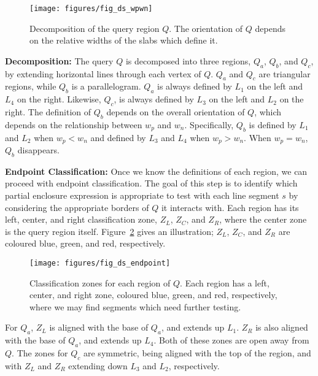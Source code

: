 \begin{figure}[t]
\begin{center}
  \texttt{[image: figures/fig\_ds\_wpwn]}
  \caption[Decomposition of the query region $Q$.]{Decomposition of the query region $Q$. The orientation of $Q$ depends on the relative widths of the slabs which define it.}
  \label{fig:slabs:two:wpwn}
\end{center}
\end{figure}

{\bf Decomposition:}
The query $Q$ is decomposed into three regions, $Q_a$, $Q_b$, and $Q_c$, by extending horizontal lines through each vertex of $Q$.
$Q_a$ and $Q_c$ are triangular regions, while $Q_b$ is a parallelogram. 
$Q_a$ is always defined by $L_1$ on the left and $L_4$ on the right. 
Likewise, $Q_c$, is always defined by $L_3$ on the left and $L_2$ on the right. 
The definition of $Q_b$ depends on the overall orientation of $Q$, which depends on the relationship between $w_p$ and $w_n$.
Specifically, $Q_b$ is defined by $L_1$ and $L_2$ when $w_p < w_n$ and defined by $L_3$ and $L_4$ when $w_p > w_n$.
When $w_p = w_n$, $Q_b$ disappears.


{\bf Endpoint Classification:}
Once we know the definitions of each region, we can proceed with endpoint classification.
The goal of this step is to identify which partial enclosure expression is appropriate to test with each line segment $s$ by considering the appropriate borders of $Q$ it interacts with. 
Each region has its left, center, and right classification zone, $Z_L$, $Z_C$, and $Z_R$, where the center zone is the query region itself.
Figure~\ref{fig:slabs:two:endpoint} gives an illustration; $Z_L$, $Z_C$, and $Z_R$ are coloured blue, green, and red, respectively.

\begin{figure}[t]
\begin{center}
  \texttt{[image: figures/fig\_ds\_endpoint]}
  \caption[Classification zones for $Q$.]{Classification zones for each region of $Q$. Each region has a left, center, and right zone, coloured blue, green, and red, respectively, where we may find segments which need further testing.}
  \label{fig:slabs:two:endpoint}
\end{center}
\end{figure}

For $Q_a$, $Z_L$ is aligned with the base of $Q_a$, and extends up $L_1$. 
$Z_R$ is also aligned with the base of $Q_a$, and extends up $L_4$.
Both of these zones are open away from $Q$.
The zones for $Q_c$ are symmetric, being aligned with the top of the region, and with $Z_L$ and $Z_R$ extending down $L_3$ and $L_2$, respectively.

